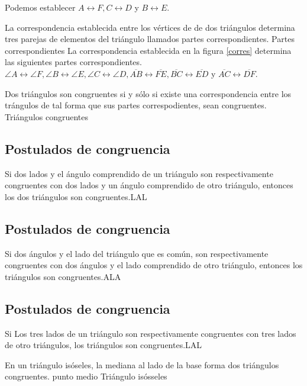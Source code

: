 Podemos establecer $A\longleftrightarrow F , C \longleftrightarrow D$ y
$B\longleftrightarrow E$.
\begin{definicion}{La correspondencia establecida entre los v\'ertices
de de dos tri\'angulos determina tres parejas de elementos del tri\'angulo
llamados partes correspondientes. }{Partes correspondientes}
 La correspondencia establecida en la figura \ref{corres} determina las
siguientes partes correspondientes.\\
$\angle A \longleftrightarrow \angle F, \angle B \longleftrightarrow \angle E,
\angle C \longleftrightarrow \angle D, \overline{AB}\longleftrightarrow
\overline{FE}, \overline{BC}\longleftrightarrow
\overline{ED}$ y $\overline{AC}\longleftrightarrow
\overline{DF}.$
\end{definicion}
\begin{definicion}{Dos tri\'angulos son congruentes si y s\'olo si existe una
correspondencia entre los tr\'angulos de tal forma que sus partes
correspodientes, sean congruentes.
}{Tri\'angulos congruentes}

\end{definicion}
\subsection{Postulados de congruencia}
\begin{postulado}{Si dos lados y el \'angulo comprendido de un tri\'angulo
son respectivamente congruentes con dos lados y un \'angulo comprendido de
otro tri\'angulo, entonces los dos tri\'angulos son congruentes.}{LAL}
\end{postulado}
\subsection{Postulados de congruencia}
\begin{postulado}{Si dos \'angulos y el lado del tri\'angulo que es com\'un,
son respectivamente congruentes con dos \'angulos y el lado comprendido de
otro tri\'angulo, entonces los tri\'angulos son congruentes.}{ALA}
\end{postulado}
\subsection{Postulados de congruencia}
\begin{postulado}{Si Los tres lados de un tri\'angulo son respectivamente
congruentes con tres lados de otro tri\'angulos, los tri\'angulos son
congruentes.}{LAL}
\end{postulado}
\begin{teorema}{
En un tri\'angulo is\'oseles, la mediana al lado de la base forma dos
tri\'angulos congruentes. punto medio 
}{Tri\'angulo is\'osseles}
\end{teorema}

